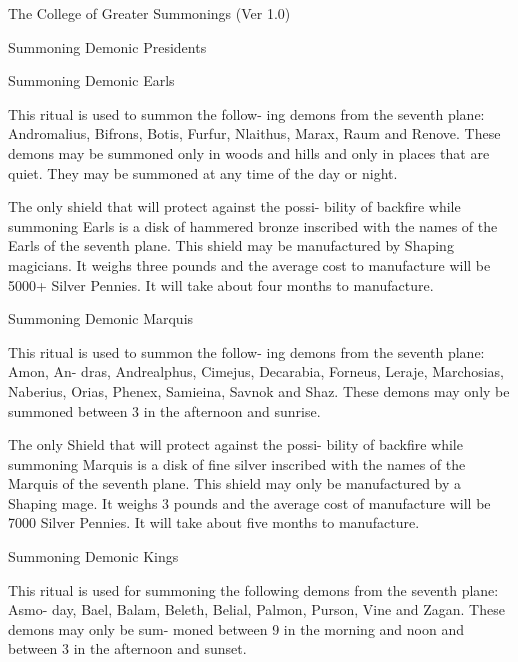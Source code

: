 \begin{Chapter}{The College of Greater Summonings (Ver 1.0)}
\begin{ritual}[R-3]{Summoning Demonic Presidents }
\begin{effects}
\end{effects}
\end{ritual}

\begin{ritual}[R-4]{Summoning Demonic Earls }

\begin{effects}
 This  ritual  is  used  to  summon  the  follow-
ing  demons  from  the  seventh  plane:  Andromalius, 
Bifrons, Botis, Furfur, Nlaithus, Marax, Raum and 
Renove. These demons may be summoned only in 
woods  and  hills  and  only  in  places  that  are  quiet. 
They may be summoned at any time of the day or 
night. 

The only shield that will protect against the possi-
bility of backfire  while summoning Earls is a disk 
of  hammered  bronze  inscribed  with  the  names  of 
the Earls of the seventh plane. This shield may be 
manufactured  by  Shaping  magicians.  It  weighs 
three  pounds  and  the  average  cost  to  manufacture 
will  be  5000+  Silver  Pennies.  It  will  take  about 
four months to manufacture. 

\end{effects}
\end{ritual}

\begin{ritual}[R-5]{Summoning Demonic Marquis }

\begin{effects}
 This  ritual  is  used  to  summon  the  follow-
ing  demons  from  the  seventh  plane:  Amon,  An-
dras,  Andrealphus,  Cimejus,  Decarabia,  Forneus, 
Leraje,  Marchosias,  Naberius,  Orias,  Phenex, 
Samieina,  Savnok  and  Shaz.  These  demons  may 
only be summoned between 3 in the afternoon and 
sunrise. 

The only Shield that will protect against the possi-
bility  of  backfire  while  summoning  Marquis  is  a 
disk  of  fine  silver  inscribed  with the  names  of  the 
Marquis of the seventh plane. This shield may only 
be  manufactured  by  a  Shaping  mage.  It  weighs  3 
pounds and the average cost of manufacture will be 
7000 Silver Pennies. It will take about five months 
to manufacture. 

\end{effects}
\end{ritual}

\begin{ritual}[R-6]{Summoning Demonic Kings }

\begin{effects}
 This  ritual  is  used  for  summoning  the 
following  demons  from  the  seventh  plane:  Asmo-
day,  Bael,  Balam,  Beleth,  Belial,  Palmon,  Purson, 
Vine and Zagan. These demons may only be sum-
moned  between  9  in  the  morning  and  noon  and 
between 3 in the afternoon and sunset. 


\end{effects}
\end{ritual}
\end{Chapter}
